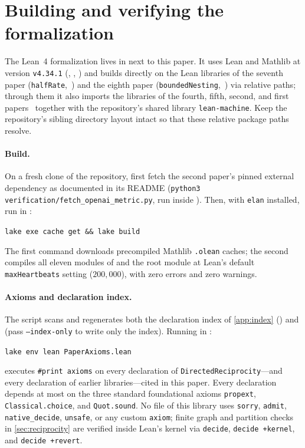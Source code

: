 \section{Building and verifying the formalization}\label{app:verify}

The Lean~4 formalization lives in  next to this paper. It uses Lean and Mathlib at version \texttt{v4.34.1}
(, , ) and builds directly on
the Lean libraries of the seventh paper (\texttt{halfRate},~\cite{SeventhPaper2026}) and the eighth paper
(\texttt{boundedNesting},~\cite{EighthPaper2026}) via relative paths; through them it also imports the libraries of the
fourth, fifth, second, and first papers~\cite{FourthPaper2026,DirectedRecovery2026,SecondPaper2026,FirstPaper2026} together
with the repository's shared library \texttt{lean-machine}. Keep the repository's sibling directory layout intact so that
these relative package paths resolve.

\paragraph{Build.} On a fresh clone of the repository, first fetch the second paper's pinned external dependency as
documented in its README (\texttt{python3 verification/fetch\_openai\_metric.py}, run inside
). Then, with \texttt{elan}
installed, run in :
\begin{center}
\texttt{lake exe cache get \&\& lake build}
\end{center}
The first command downloads precompiled Mathlib \texttt{.olean} caches; the second compiles all eleven modules of
 and the root module  at Lean's default
\texttt{maxHeartbeats} setting ($200{,}000$), with zero errors and zero warnings.

\paragraph{Axioms and declaration index.} The script  scans 
and regenerates both the declaration index of \cref{app:index} () and
 (pass \texttt{--index-only} to write only the index). Running in :
\begin{center}
\texttt{lake env lean PaperAxioms.lean}
\end{center}
executes \texttt{\#print axioms} on every declaration of \texttt{DirectedReciprocity}---and every declaration of earlier
libraries---cited in this paper. Every declaration depends at most on the three standard foundational axioms
\texttt{propext}, \texttt{Classical.choice}, and \texttt{Quot.sound}. No file of this library uses \texttt{sorry}, \texttt{admit}, \texttt{native\_decide}, \texttt{unsafe},
or any custom \texttt{axiom}; finite graph and partition checks in \cref{sec:reciprocity} are verified inside Lean's kernel
via \texttt{decide}, \texttt{decide +kernel}, and \texttt{decide +revert}.

